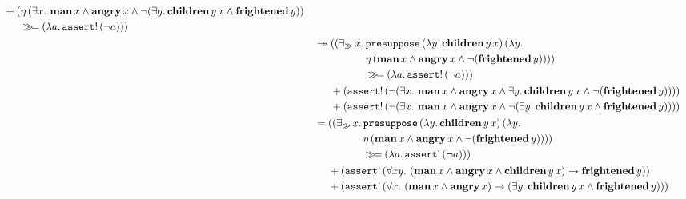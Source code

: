 \begin{align*}
\begin{aligned}[t]
\begin{aligned}[t]
         \end{aligned} \\
     &+ (\begin{aligned}[t]
           &\eta\,(\exists x.\ \textbf{man}\,x \land \textbf{angry}\,x \land
                  \lnot (\exists y.\, \textbf{children}\,y\,x \land
                  \textbf{frightened}\,y)) \\
           &\mathbin{\gg\!=} (\lambda a.\, \mathtt{assert}!\,(\lnot a)))
         \end{aligned}
    \end{aligned} \\
  &\twoheadrightarrow \begin{aligned}[t]
     &((\mathop{\exists_\gg} x.\, \begin{aligned}[t]
         &\mathtt{presuppose}\,(\lambda y.\, \textbf{children}\,y\,x)\,(\lambda y.\,  \\
         &\eta\,(\textbf{man}\,x \land \textbf{angry}\,x \land \lnot (\textbf{frightened}\,y)))) \\
         &\mathbin{\gg\!=} (\lambda a.\, \mathtt{assert}!\,(\lnot a))) \\
       \end{aligned} \\
     &+ (\mathtt{assert}!\,(\lnot (\exists x.\ \textbf{man}\,x \land \textbf{angry}\,x \land
                   \exists y.\, \textbf{children}\,y\,x \land
                   \lnot (\textbf{frightened}\,y)))) \\
     &+ (\mathtt{assert}!\,(\lnot (\exists x.\ \textbf{man}\,x \land \textbf{angry}\,x \land
                   \lnot (\exists y.\, \textbf{children}\,y\,x \land
                   \textbf{frightened}\,y)))) \\
   \end{aligned} \\
  &= \begin{aligned}[t]
     &((\mathop{\exists_\gg} x.\, \begin{aligned}[t]
         &\mathtt{presuppose}\,(\lambda y.\, \textbf{children}\,y\,x)\,(\lambda y.\,  \\
         &\eta\,(\textbf{man}\,x \land \textbf{angry}\,x \land \lnot (\textbf{frightened}\,y)))) \\
         &\mathbin{\gg\!=} (\lambda a.\, \mathtt{assert}!\,(\lnot a))) \\
       \end{aligned} \\
     &+ (\mathtt{assert}!\,(\forall x y.\ (\textbf{man}\,x \land \textbf{angry}\,x \land
                          \textbf{children}\,y\,x) \to \textbf{frightened}\,y)) \\
     &+ (\mathtt{assert}!\,(\forall x.\ (\textbf{man}\,x \land \textbf{angry}\,x) \to (\exists y.\, \textbf{children}\,y\,x \land \textbf{frightened}\,y)))
   \end{aligned}
\end{align*}

